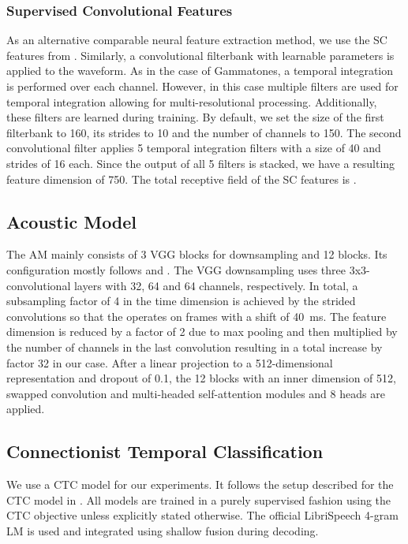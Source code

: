 \documentclass{INTERSPEECH2023}
\begin{document}
\subsubsection{Supervised Convolutional Features}
As an alternative comparable neural feature extraction method, we use the \gls{SC} features from \cite{tuske2018:waveform, vieting2021waveform}.
Similarly, a convolutional filterbank with learnable parameters is applied to the waveform.
As in the case of Gammatones, a temporal integration is performed over each channel.
However, in this case multiple filters are used for temporal integration allowing for multi-resolutional processing.
Additionally, these filters are learned during training.
By default, we set the size of the first filterbank to 160, its strides to 10 and the number of channels to 150.
The second convolutional filter applies 5 temporal integration filters with a size of 40 and strides of 16 each.
Since the output of all 5 filters is stacked, we have a resulting feature dimension of 750.
The total receptive field of the \gls{SC} features is .

\subsection{Acoustic Model}
The \gls{AM} mainly consists of 3 VGG blocks for downsampling and 12 \conformer blocks.
Its configuration mostly follows \cite{zeineldeen2022conformer} and \cite{zhou2022efficient}.
The VGG downsampling uses three 3x3-convolutional layers with 32, 64 and 64 channels, respectively.
In total, a subsampling factor of 4 in the time dimension is achieved by the strided convolutions so that the \conformer operates on frames with a shift of \SI{40}{\milli\second}.
The feature dimension is reduced by a factor of 2 due to max pooling and then multiplied by the number of channels in the last convolution resulting in a total increase by factor 32 in our case.
After a linear projection to a 512-dimensional representation and dropout of 0.1, the 12 \conformer blocks with an inner dimension of 512, swapped convolution and multi-headed self-attention modules and 8 heads are applied.


\subsection{Connectionist Temporal Classification}
We use a \gls{CTC} model for our experiments.
It follows the setup described for the \gls{CTC} model in \cite{zhou2022efficient}.
All models are trained in a purely supervised fashion using the \gls{CTC} objective unless explicitly stated otherwise.
The official LibriSpeech 4-gram \gls{LM} is used and integrated using shallow fusion \cite{gulcehre2015shallow} during decoding.
\end{document}
